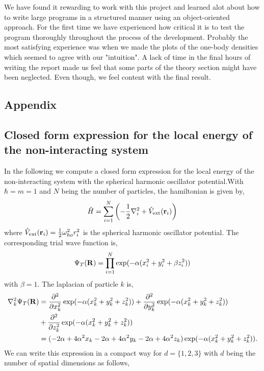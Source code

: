 \documentclass[a4paper,10pt]{article}
\begin{document}
We have found it rewarding to work with this project and learned alot about how to write large programs in a structured manner using 
an object-oriented approach. For the first time we have experienced how critical it is to test the program thoroughly throughout the process of the development.
Probably the most satisfying experience was when we made the plots of the one-body densities which seemed to agree with our "intuition". A lack of time in the 
final hours of writing the report made us feel that some parts of the theory section might have been neglected. Even though, we feel content with the final result.
\begin{appendices}
\section{Appendix}
\subsection{Closed form expression for the local energy of the non-interacting system} \label{non-interacting energy}
In the following we compute a closed form expression for the local energy of the non-interacting system with the spherical harmonic
oscillator potential.With $\hbar = m = 1$ and $N$ being the number of particles, the hamiltonian is given by,
\begin{equation}
 \hat{H} = \sum_{i=1}^N \left( -\frac{1}{2}\nabla_i^2 + \hat{V}_{\text{ext}}({\bf r}_i) \right)
\end{equation}
where $\hat{V}_{\text{ext}}({\bf r}_i) = \frac{1}{2}\omega_{ho}^2r_i^2$ is the spherical harmonic oscillator potential. The corresponding trial wave function 
is,
\begin{equation}
 \Psi_T({\bf R}) = \prod_{i=1}^N \exp(-\alpha(x_i^2 + y_i^2 + \beta z_i^2))
\end{equation}
with $\beta = 1$. The laplacian of particle $k$ is,
\begin{align*}
 \nabla_k^2 \Psi_T({\bf R}) &= \frac{\partial^2}{\partial x_k^2}\exp(-\alpha(x_k^2 + y_k^2 + z_k^2)) + \frac{\partial^2}{\partial y_k^2}\exp(-\alpha(x_k^2 + y_k^2 + z_k^2)) \\
			      &+ \frac{\partial^2}{\partial z_k^2}\exp(-\alpha(x_k^2 + y_k^2 + z_k^2)) \\
			      &= (-2\alpha + 4\alpha^2x_k -2\alpha + 4\alpha^2y_k -2\alpha + 4\alpha^2z_k)\exp(-\alpha(x_k^2 + y_k^2 + z_k^2)).
\end{align*}
We can write this expression in a compact way for $d=\{1,2,3\}$ with $d$ being the number of spatial dimensions as follows, 

\end{appendices}
\end{document}
